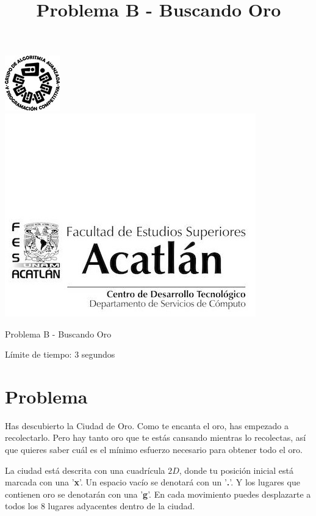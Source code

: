 \documentclass[letter,10pt]{article}
\date{}
\begin{document}
\title{Problema B - Buscando Oro}

\includegraphics[scale=0.7]{logo} \hspace*{9.00cm}
\includegraphics[scale=0.5]{dsc} 
\bigskip
\begin{center}
	\Large Problema B - Buscando Oro
\end{center}

\begin{flushright}
Límite de tiempo: 3 segundos
\par\end{flushright}
\bigskip

\section*{Problema}

Has descubierto la Ciudad de Oro. Como te encanta el oro, has empezado a recolectarlo. Pero hay tanto oro que te estás cansando mientras lo recolectas, así que quieres saber cuál es el mínimo esfuerzo necesario para obtener todo el oro.

La ciudad está descrita con una cuadrícula $2D$, donde tu posición inicial está marcada con una '\textbf{x}'. Un espacio vacío se denotará con un '\textbf{.}'. Y los lugares que contienen oro se denotarán con una '\textbf{g}'. En cada movimiento puedes desplazarte a todos los $8$ lugares adyacentes dentro de la ciudad.
\end{document}
